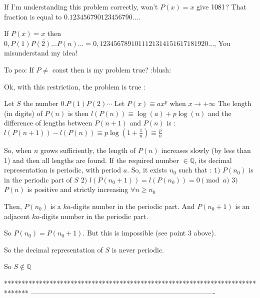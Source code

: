 \begin{solution}
	If I'm understanding this problem correctly, won't $ P(x) = x$ give $ 10\/81$? That fraction is equal to $ 0.123456790123456790\ldots$.
\end{solution}



\begin{solution}
	If $ P(x)=x$ then $ \overline{0,P(1)P(2)...P(n)...}=0,1234567891011121314151617181920...$, You misunderstand my idea!
\end{solution}



\begin{solution}
	\begin{tcolorbox}To pco: If $ P\neq$ const then is my problem true? :blush: \end{tcolorbox}

Ok, with this restriction, the problem is true :

Let $ S$ the number $ 0.P(1)P(2)\cdots$
Let $ P(x)\equiv ax^p$ when $ x\rightarrow +\infty$
The length (in digits) of $ P(n)$ is then $ l(P(n))\equiv \log(a)+p\log(n)$ and the difference of lengths between $ P(n+1)$ and $ P(n)$ is :
$ l(P(n+1))-l(P(n))\equiv p\log(1+\frac{1}{n})\equiv \frac{p}{n}$

So, when $ n$ grows sufficiently, the length of $ P(n)$ increases slowly (by less than 1) and then all lengths are found.
If the required number $ \in\mathbb{Q}$, its decimal representation is periodic, with period $ a$.
So, it exists $ n_0$ such that :
$ 1)$ $ P(n_0)$ is in the periodic part of $ S$
$ 2)$ $ l(P(n_0+1))=l(P(n_0))=0\pmod{a}$
$ 3)$ $ P(n)$ is positive and strictly increasing $ \forall n\geq n_0$

Then, $ P(n_0)$ is a $ ka$-digits number in the periodic part.
And $ P(n_0+1)$ is an adjacent $ ka$-digits number in the periodic part.

So $ P(n_0)=P(n_0+1)$. But this is impossible (see point 3 above).

So the decimal representation of $ S$ is never periodic.

So $ S\notin \mathbb{Q}$
\end{solution}
*******************************************************************************
-------------------------------------------------------------------------------

